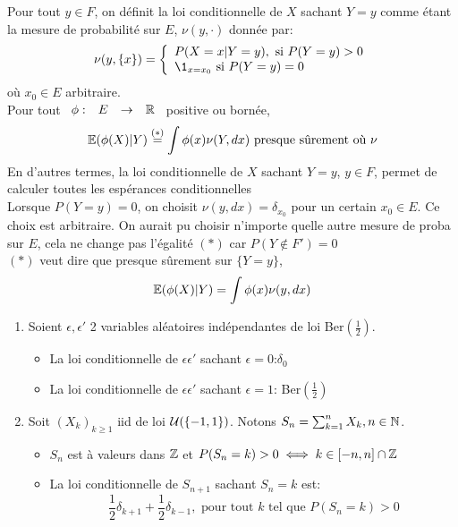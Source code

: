 \documentclass[]{report}
\begin{document}
    \begin{dfprop}{}{}
        Pour tout $y\in F$, on définit la loi conditionnelle de $X$ sachant $Y=y$ comme étant la mesure de probabilité sur $E$, $\nu(y,\cdot)$ donnée par:
        \[\nu(y,\{x\})=\cho{P(X=x|Y=y),\text{ si }P(Y=y)>0\\ \1_{x=x_0}\text{ si }P(Y=y)=0}\]
        où $x_0\in E$ arbitraire.\\
        Pour tout $\begin{array}{ccccc} \phi : & E & \to & \mathbb{R} \end{array}$ positive ou bornée,
        \[\mathbb{E}(\phi(X)|Y)\overset{(*)}{=}\int \phi(x)\nu(Y,dx)\text{ presque sûrement où }\nu\]
        En d'autres termes, la loi conditionnelle de $X$ sachant $Y=y$, $y\in F$, permet de calculer toutes les espérances conditionnelles\\
        Lorsque $P(Y=y)=0$, on choisit $\nu(y,dx)=\delta_{x_0}$ pour un certain $x_0\in E$. Ce choix est arbitraire. On aurait pu choisir n'importe quelle autre mesure de proba sur $E$, cela ne change pas l'égalité $(*)$ car $P(Y\notin F')=0$\\
        $(*)$ veut dire que presque sûrement sur $\{Y=y\}$,
        \[\mathbb{E}(\phi(X)|Y)=\int \phi(x)\nu(y,dx)\]
    \end{dfprop}

    \begin{ex}{}{}
        \begin{enumerate}
            \item Soient $\epsilon,\epsilon'$ 2 variables aléatoires indépendantes de loi Ber$(\frac{1}{2})$.
            \begin{itemize}
                \item La loi conditionnelle de $\epsilon\epsilon'$ sachant $\epsilon =0$:$\delta_0$
                \item La loi conditionnelle de $\epsilon\epsilon'$ sachant $\epsilon =1$: Ber$(\frac{1}{2})$
            \end{itemize}
            \item Soit $(X_k)_{k\ge 1}$ iid de loi $\mathcal{U}(\{-1,1\})$. Notons $S_n=\sum_{k=1}^{n}X_k,n\in\mathbb{N}$.
            \begin{itemize}
                \item $S_n$ est à valeurs dans $\mathbb{Z}$ et $P(S_n=k)>0\iff k\in [-n,n]\cap \mathbb{Z}$
                \item La loi conditionnelle de $S_{n+1}$ sachant $S_n=k$ est:
                \[\frac{1}{2}\delta_{k+1}+\frac{1}{2}\delta_{k-1},\text{ pour tout $k$ tel que $P(S_n=k)>0$}\]
            \end{itemize}
        \end{enumerate}
    \end{ex}
\end{document}
